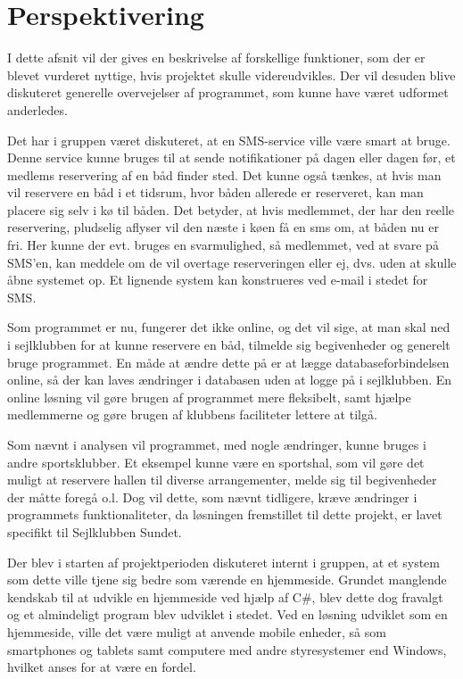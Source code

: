 \chapter{Perspektivering}

I dette afsnit vil der gives en beskrivelse af forskellige funktioner, som der er blevet vurderet nyttige, hvis projektet skulle videreudvikles. 
Der vil desuden blive diskuteret generelle overvejelser af programmet, som kunne have været udformet anderledes. 

Det har i gruppen været diskuteret, at en SMS-service ville være smart at bruge. 
Denne service kunne bruges til at sende notifikationer på dagen eller dagen før, et medlems reservering af en båd finder sted. 
Det kunne også tænkes, at hvis man vil reservere en båd i et tidsrum, hvor båden allerede er reserveret, kan man placere sig selv i kø til båden.
Det betyder, at hvis medlemmet, der har den reelle reservering, pludselig aflyser vil den næste i køen få en sms om, at båden nu er fri.
Her kunne der evt. bruges en svarmulighed, så medlemmet, ved at svare på SMS'en, kan meddele om de vil overtage reserveringen eller ej, dvs. uden at skulle åbne systemet op. 
Et lignende system kan konstrueres ved e-mail i stedet for SMS.

Som programmet er nu, fungerer det ikke online, og det vil sige, at man skal ned i sejlklubben for at kunne reservere en båd, tilmelde sig begivenheder og generelt bruge programmet. 
En måde at ændre dette på er at lægge databaseforbindelsen online, så der kan laves ændringer i databasen uden at logge på i sejlklubben. 
En online løsning vil gøre brugen af programmet mere fleksibelt, samt hjælpe medlemmerne og gøre brugen af klubbens faciliteter lettere at tilgå.

Som nævnt i analysen vil programmet, med nogle ændringer, kunne bruges i andre sportsklubber. 
Et eksempel kunne være en sportshal, som vil gøre det muligt at reservere hallen til diverse arrangementer, melde sig til begivenheder der måtte foregå o.l. 
Dog vil dette, som nævnt tidligere, kræve ændringer i programmets funktionaliteter, da løsningen fremstillet til dette projekt, er lavet specifikt til Sejlklubben Sundet.

Der blev i starten af projektperioden diskuteret internt i gruppen, at et system som dette ville tjene sig bedre som værende en hjemmeside.
Grundet manglende kendskab til at udvikle en hjemmeside ved hjælp af C\#, blev dette dog fravalgt og et almindeligt program blev udviklet i stedet. 
Ved en løsning udviklet som en hjemmeside, ville det være muligt at anvende mobile enheder, så som smartphones og tablets samt computere med andre styresystemer end Windows, hvilket anses for at være en fordel.  

